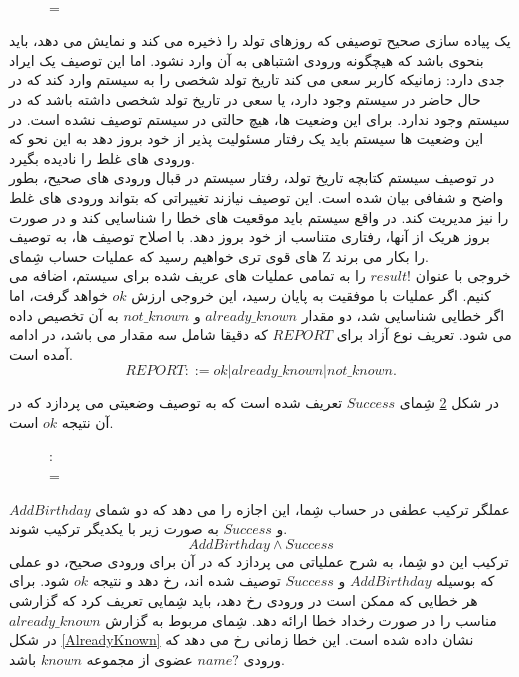 \begin{figure}
\centering
\begin{schema}{}
 \\
\ST
{}= \varnothing
\end{schema}
\caption{}
\label{InitBirthdayBook}
\end{figure} 
یک پیاده سازی صحیح توصیفی که روزهای تولد را ذخیره می کند و نمایش می دهد، باید بنحوی باشد که هیچگونه ورودی اشتباهی به آن وارد نشود. اما این توصیف یک ایراد جدی دارد: زمانیکه کاربر سعی می کند تاریخ تولد شخصی را به سیستم وارد کند که در حال حاضر در سیستم وجود دارد، یا سعی در تاریخ تولد شخصی داشته باشد که در سیستم وجود ندارد. برای این وضعیت ها، هیچ حالتی در سیستم توصیف نشده است. در این وضعیت ها سیستم باید یک رفتار مسئولیت پذیر از خود بروز دهد به این نحو که ورودی های غلط را نادیده بگیرد. \\
 در توصیف سیستم کتابچه تاریخ تولد، رفتار سیستم در قبال ورودی های صحیح، بطور واضح و شفافی بیان شده است. این توصیف نیازند تغییراتی که بتواند ورودی های غلط را نیز مدیریت کند. در واقع سیستم باید موقعیت های خطا را شناسایی کند و در صورت بروز هریک از آنها، رفتاری متناسب از خود بروز دهد. با اصلاح توصیف ها، به توصیف های قوی تری خواهیم رسید که  عملیات حساب شِمای Z را بکار می برند.
 \\
 خروجی با عنوان 
 $\mathit{result!}$
 را به تمامی عملیات های عریف شده برای سیستم، اضافه می کنیم. اگر عملیات با موفقیت به پایان رسید، این خروجی ارزش 
 $ok$
 خواهد گرفت، اما اگر خطایی شناسایی شد، دو مقدار
 $\mathit{already\_known}$
 و
 $\mathit{not\_known}$
 به آن تخصیص داده می شود.
 تعریف نوع آزاد
برای $REPORT$ که دقیقا شامل سه مقدار می باشد، در ادامه آمده است.
\\
\[
REPORT ::= \mathit{ok} | \mathit{already\_known} | \mathit{not\_known}.
\]

  در شکل 
  \ref{Success}
  شِمای $\mathit{Success}$ تعریف شده است که به توصیف وضعیتی می پردازد که در آن نتیجه $\mathit{ok}$ است.
 \begin{figure}
\centering
\begin{schema}{}
 :\enspace {}\\
\ST
{}=  
\end{schema}
\caption{}
\label{Success}
\end{figure}       
عملگر ترکیب عطفی در حساب شِما، این اجازه را می دهد که دو شمای 
$\mathit{AddBirthday}$
و
$\mathit{Success}$
به صورت زیر با یکدیگر ترکیب شوند.
\[
\mathit{AddBirthday \wedge Success}
\]
ترکیب این دو شِما، به شرح عملیاتی می پردازد که در آن برای ورودی صحیح، دو عملی که بوسیله 
$\mathit{AddBirthday}$
و
$\mathit{Success}$
توصیف شده اند، رخ دهد و نتیجه
$\mathit{ok}$
شود.
برای هر خطایی که ممکن است در ورودی رخ دهد، باید شِمایی تعریف کرد که گزارشی مناسب را در صورت رخداد خطا ارائه دهد. شِمای مربوط به گزارش 
$already\_known$
  در شکل \ref{AlreadyKnown} نشان داده شده است. این خطا زمانی رخ می دهد که ورودی 
$\mathit{name?}$
عضوی از مجموعه 
$\mathit{known}$
باشد.

